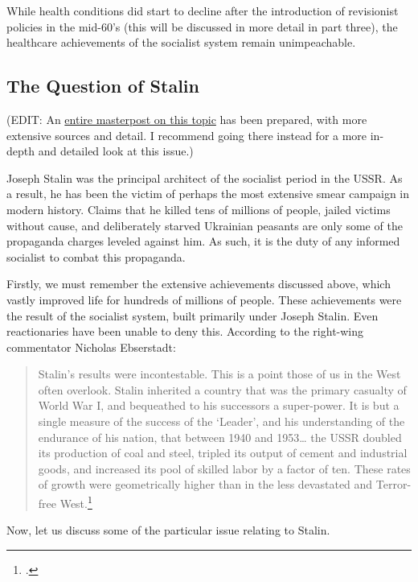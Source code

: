 While health conditions did start to decline after the introduction of
revisionist policies in the mid-60's (this will be discussed in more
detail in part three), the healthcare achievements of the socialist
system remain unimpeachable.

\subsection*{The Question of Stalin}

(EDIT: An
\href{https://www.reddit.com/r/communism/comments/e8kpow/masterpost_on_joseph_stalin_and_the_great_purge/}{entire
masterpost on this topic} has been prepared, with more extensive sources
and detail. I recommend going there instead for a more in-depth and
detailed look at this issue.)

Joseph Stalin was the principal architect of the socialist period in the
USSR. As a result, he has been the victim of perhaps the most extensive
smear campaign in modern history. Claims that he killed tens of millions
of people, jailed victims without cause, and deliberately starved
Ukrainian peasants are only some of the propaganda charges leveled
against him. As such, it is the duty of any informed socialist to combat
this propaganda.

Firstly, we must remember the extensive achievements discussed above,
which vastly improved life for hundreds of millions of people. These
achievements were the result of the socialist system, built primarily
under Joseph Stalin. Even reactionaries have been unable to deny this.
According to the right-wing commentator Nicholas Ebserstadt:

\begin{quote}
Stalin's results were incontestable. This is a point those of us in the
West often overlook. Stalin inherited a country that was the primary
casualty of World War I, and bequeathed to his successors a super-power.
It is but a single measure of the success of the `Leader', and his
understanding of the endurance of his nation, that between 1940 and
1953\ldots{} the USSR doubled its production of coal and steel, tripled
its output of cement and industrial goods, and increased its pool of
skilled labor by a factor of ten. These rates of growth were
geometrically higher than in the less devastated and Terror-free West.\footcite{eberstadt2006health}
\end{quote}

Now, let us discuss some of the particular issue relating to Stalin.

